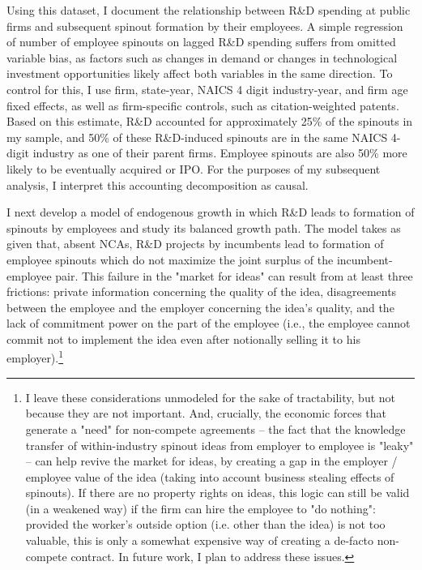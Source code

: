 \documentclass[12pt,english]{article}
\theoremstyle{remark}
\begin{document}
Using this dataset, I document the relationship between R\&D spending at public firms and subsequent spinout formation by their employees. A simple regression of number of employee spinouts on lagged R\&D spending suffers from omitted variable bias, as factors such as changes in demand or changes in technological investment opportunities likely affect both variables in the same direction. To control for this, I use firm, state-year, NAICS 4 digit industry-year, and firm age fixed effects, as well as firm-specific controls, such as citation-weighted patents. Based on this estimate, R\&D accounted for approximately 25\% of the spinouts in my sample, and 50\% of these R\&D-induced spinouts are in the same NAICS 4-digit industry as one of their parent firms. Employee spinouts are also 50\% more likely to be eventually acquired or IPO. For the purposes of my subsequent analysis, I interpret this accounting decomposition as causal. 

I next develop a model of endogenous growth in which R\&D leads to formation of spinouts by employees and study its balanced growth path. The model takes as given that, absent NCAs, R\&D projects by incumbents lead to formation of employee spinouts which do not maximize the joint surplus of the incumbent-employee pair. This failure in the "market for ideas" can result from at least three frictions: private information concerning the quality of the idea, disagreements between the employee and the employer concerning the idea's quality, and the lack of commitment power on the part of the employee (i.e., the employee cannot commit not to implement the idea even after notionally selling it to his employer).\footnote{I leave these considerations unmodeled for the sake of tractability, but not because they are not important. And, crucially, the economic forces that generate a "need" for non-compete agreements -- the fact that the knowledge transfer of within-industry spinout ideas from employer to employee is "leaky" -- can help revive the market for ideas, by creating a gap in the employer / employee value of the idea (taking into account business stealing effects of spinouts). If there are no property rights on ideas, this logic can still be valid (in a weakened way) if the firm can hire the employee to "do nothing": provided the worker's outside option (i.e. other than the idea) is not too valuable, this is only a somewhat expensive way of creating a de-facto non-compete contract. In future work, I plan to address these issues.} 
\end{document}
